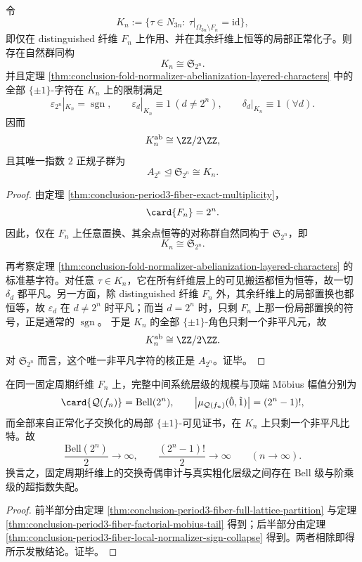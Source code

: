 \begin{theorem}\label{thm:conclusion-period3-fiber-local-normalizer-sign-collapse}
令
\[
K_n:=\{\tau\in N_{3n}:\ \tau|_{\Omega_{3n}\setminus F_n}=\mathrm{id}\},
\]
即仅在 distinguished 纤维 \(F_n\) 上作用、并在其余纤维上恒等的局部正常化子。则存在自然群同构
\[
K_n\cong \mathfrak S_{2^n}.
\]
并且定理 \ref{thm:conclusion-fold-normalizer-abelianization-layered-characters} 中的全部 \(\{\pm1\}\)-字符在 \(K_n\) 上的限制满足
\[
\varepsilon_{2^n}|_{K_n}=\operatorname{sgn},
\qquad
\varepsilon_d|_{K_n}\equiv 1\ (d\neq 2^n),
\qquad
\delta_d|_{K_n}\equiv 1\ (\forall d).
\]
因而
\[
K_n^{\mathrm{ab}}\cong \ZZ/2\ZZ,
\]
且其唯一指数 \(2\) 正规子群为
\[
A_{2^n}\trianglelefteq \mathfrak S_{2^n}\cong K_n.
\]
\end{theorem}
\begin{proof}
由定理 \ref{thm:conclusion-period3-fiber-exact-multiplicity}，
\[
\card{F_n}=2^n.
\]
因此，仅在 \(F_n\) 上任意置换、其余点恒等的对称群自然同构于 \(\mathfrak S_{2^n}\)，即
\[
K_n\cong \mathfrak S_{2^n}.
\]

再考察定理 \ref{thm:conclusion-fold-normalizer-abelianization-layered-characters} 的标准基字符。对任意 \(\tau\in K_n\)，它在所有纤维层上的可见搬运都恒为恒等，故一切 \(\delta_d\) 都平凡。另一方面，除 distinguished 纤维 \(F_n\) 外，其余纤维上的局部置换也都恒等，故 \(\varepsilon_d\) 在 \(d\neq 2^n\) 时平凡；而当 \(d=2^n\) 时，只剩 \(F_n\) 上那一份局部置换的符号，正是通常的
\(\operatorname{sgn}\)。
于是 \(K_n\) 的全部 \(\{\pm1\}\)-角色只剩一个非平凡元，故
\[
K_n^{\mathrm{ab}}\cong \ZZ/2\ZZ.
\]
对 \(\mathfrak S_{2^n}\) 而言，这个唯一非平凡字符的核正是 \(A_{2^n}\)。证毕。
\end{proof}

\begin{corollary}\label{cor:conclusion-period3-fiber-bell-vs-one-gap}
在同一固定周期纤维 \(F_n\) 上，完整中间系统层级的规模与顶端 Möbius 幅值分别为
\[
\card{\mathcal Q(f_n)}=\mathrm{Bell}(2^n),
\qquad
\bigl|\mu_{\mathcal Q(f_n)}(\hat0,\hat1)\bigr|=(2^n-1)!,
\]
而全部来自正常化子交换化的局部 \(\{\pm1\}\)-可见证书，在 \(K_n\) 上只剩一个非平凡比特。故
\[
\frac{\mathrm{Bell}(2^n)}{2}\to\infty,
\qquad
\frac{(2^n-1)!}{2}\to\infty
\qquad(n\to\infty).
\]
换言之，固定周期纤维上的交换奇偶审计与真实粗化层级之间存在 Bell 级与阶乘级的超指数失配。
\end{corollary}
\begin{proof}
前半部分由定理 \ref{thm:conclusion-period3-fiber-full-lattice-partition} 与定理 \ref{thm:conclusion-period3-fiber-factorial-mobius-tail} 得到；后半部分由定理 \ref{thm:conclusion-period3-fiber-local-normalizer-sign-collapse} 得到。两者相除即得所示发散结论。证毕。
\end{proof}

